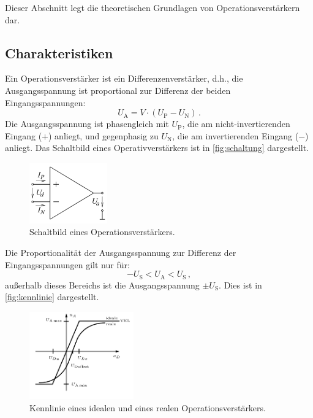  
\noindent
Dieser Abschnitt legt die theoretischen Grundlagen von Operationsverstärkern dar.

\subsection{Charakteristiken}

\noindent 
Ein Operationsverstärker ist ein Differenzenverstärker, d.h., die Ausgangsspannung ist proportional zur Differenz der beiden Eingangsspannungen:
\begin{equation*}
    U_\text{A} = V \cdot \left( U_\text{P} - U_\text{N}\right)\, .
\end{equation*}
Die Ausgangsspannung ist phasengleich mit $U_\text{P}$, die am nicht-invertierenden Eingang ($+$) anliegt, und gegenphasig zu $U_\text{N}$, die am invertierenden Eingang ($-$) anliegt. Das Schaltbild eines Operativverstärkers ist in \autoref{fig:schaltung} dargestellt.

\begin{figure}%
    \centering%
    \includegraphics[width=0.3\textwidth]{Bilder/OpAmp.png}%
    \caption{Schaltbild eines Operationsverstärkers.\cite{OpAmp1}}%
    \label{fig:schaltung}%
\end{figure}%

Die Proportionalität der Ausgangsspannung zur Differenz der Eingangsspannungen gilt nur für:
\begin{equation*}
    - U_\text{S} < U_\text{A} < U_\text{S}\, ,
\end{equation*}
außerhalb dieses Bereichs ist die Ausgangsspannung $\pm U_\text{S}$. Dies ist in \autoref{fig:kennlinie} dargestellt.

\begin{figure}%
    \centering%
    
    \includegraphics[width=0.4\textwidth]{Bilder/kennlinie_buch.png}%
    \caption{Kennlinie eines idealen und eines realen Operationsverstärkers. \cite{Brabetz}}%
    \label{fig:kennlinie}%
\end{figure}%

